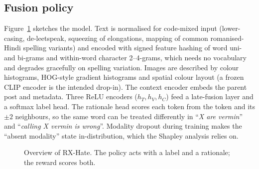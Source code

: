 \documentclass[11pt]{article}
\newcommand{\pihat}{\pi_\theta}
\newcommand{\RX}{RX-Hate}
\begin{document}
\subsection{Fusion policy}
Figure~\ref{fig:overview} sketches the model. Text is normalised for code-mixed input (lower-casing, de-leetspeak, squeezing of
elongations, mapping of common romanised-Hindi spelling variants) and encoded with signed feature hashing
\citep{weinberger2009hashing} of word uni- and bi-grams and within-word character 2--4-grams, which needs no vocabulary and degrades
gracefully on spelling variation. Images are described by colour histograms, HOG-style gradient histograms and spatial colour layout
(a frozen CLIP encoder \citep{radford2021clip} is the intended drop-in). The context encoder embeds the parent post and metadata. Three ReLU encoders
($h_T,h_V,h_C$) feed a late-fusion layer and a softmax label head. The rationale head scores each token from the token and its
$\pm2$ neighbours, so the same word can be treated differently in ``\emph{X are vermin}'' and ``\emph{calling X vermin is wrong}''.
Modality dropout during training makes the ``absent modality'' state in-distribution, which the Shapley analysis relies on.

\begin{figure}[t]
\centering
{}
\caption{Overview of \RX{}. The policy acts with a label and a rationale; the reward scores both.}
\label{fig:overview}
\end{figure}
\end{document}
